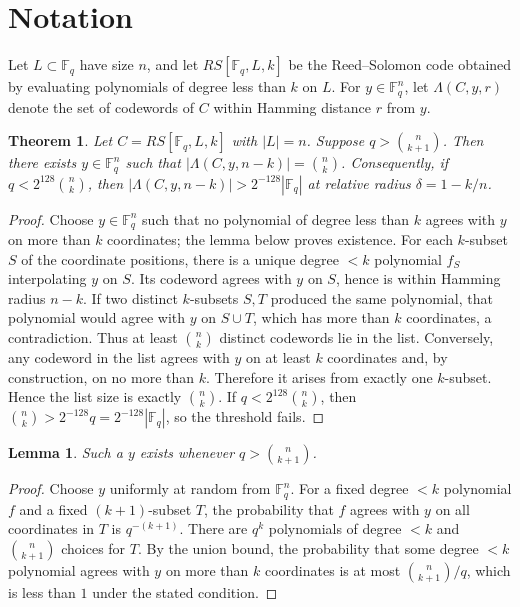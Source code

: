 \documentclass[11pt]{article}
\newtheorem{theorem}{Theorem}
\newtheorem{lemma}{Lemma}
\begin{document}
\section{Notation}
Let \(L\subset\mathbb{F}_q\) have size \(n\), and let \(RS[\mathbb{F}_q,L,k]\) be the Reed--Solomon code obtained by evaluating polynomials of degree less than \(k\) on \(L\). For \(y\in\mathbb{F}_q^n\), let \(\Lambda(C,y,r)\) denote the set of codewords of \(C\) within Hamming distance \(r\) from \(y\).
\begin{theorem}
Let \(C=RS[\mathbb{F}_q,L,k]\) with \(|L|=n\). Suppose \(q>\binom{n}{k+1}\). Then there exists \(y\in\mathbb{F}_q^n\) such that \(|\Lambda(C,y,n-k)|=\binom{n}{k}\). Consequently, if \(q<2^{128}\binom{n}{k}\), then \(|\Lambda(C,y,n-k)|>2^{-128}|\mathbb{F}_q|\) at relative radius \(\delta=1-k/n\).
\end{theorem}
\begin{proof}
Choose \(y\in\mathbb{F}_q^n\) such that no polynomial of degree less than \(k\) agrees with \(y\) on more than \(k\) coordinates; the lemma below proves existence. For each \(k\)-subset \(S\) of the coordinate positions, there is a unique degree \(<k\) polynomial \(f_S\) interpolating \(y\) on \(S\). Its codeword agrees with \(y\) on \(S\), hence is within Hamming radius \(n-k\). If two distinct \(k\)-subsets \(S,T\) produced the same polynomial, that polynomial would agree with \(y\) on \(S\cup T\), which has more than \(k\) coordinates, a contradiction. Thus at least \(\binom{n}{k}\) distinct codewords lie in the list. Conversely, any codeword in the list agrees with \(y\) on at least \(k\) coordinates and, by construction, on no more than \(k\). Therefore it arises from exactly one \(k\)-subset. Hence the list size is exactly \(\binom{n}{k}\). If \(q<2^{128}\binom{n}{k}\), then \(\binom{n}{k}>2^{-128}q=2^{-128}|\mathbb{F}_q|\), so the threshold fails.
\end{proof}
\begin{lemma}
Such a \(y\) exists whenever \(q>\binom{n}{k+1}\).
\end{lemma}
\begin{proof}
Choose \(y\) uniformly at random from \(\mathbb{F}_q^n\). For a fixed degree \(<k\) polynomial \(f\) and a fixed \((k+1)\)-subset \(T\), the probability that \(f\) agrees with \(y\) on all coordinates in \(T\) is \(q^{-(k+1)}\). There are \(q^k\) polynomials of degree \(<k\) and \(\binom{n}{k+1}\) choices for \(T\). By the union bound, the probability that some degree \(<k\) polynomial agrees with \(y\) on more than \(k\) coordinates is at most \(\binom{n}{k+1}/q\), which is less than \(1\) under the stated condition.
\end{proof}
\end{document}
